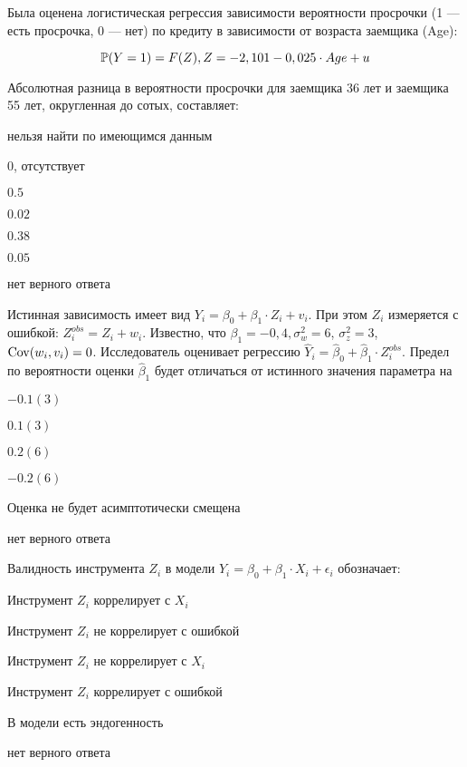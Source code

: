 \begin{question}
Была оценена логистическая регрессия зависимости вероятности просрочки (1 — есть просрочка, 0 — нет) по кредиту в зависимости от возраста заемщика (Age):

\[
  \P(Y = 1) = F (Z), Z = -2,101 - 0,025 \cdot Age+ u 
\]
   
Абсолютная разница в вероятности просрочки для заемщика 36 лет и заемщика 55 лет, округленная до сотых, составляет:
\begin{answerlist}
  \item нельзя найти по имеющимся данным
  \item $0$, отсутствует
  \item $0.5$
  \item $0.02$
  \item $0.38$
  \item $0.05$
  \item нет верного ответа
\end{answerlist}
\end{question}


\begin{question}
Истинная зависимость имеет вид  \( Y_i = \beta_0 + \beta_1 \cdot Z_i + v_i \). 
При этом \( Z_i \) измеряется с ошибкой: \( Z^{obs}_i= Z_i + w_i \). 
Известно, что \( \beta_1= -0,4, \sigma^2_{w} = 6 \), \( \sigma^2_{z} = 3 \), 
\(\Cov(w_i, v_i) = 0\). 
Исследователь оценивает регрессию  $\hat Y_i = \hat\beta_0 + \hat\beta_1 \cdot Z^{obs}_i$. 
Предел по вероятности оценки $\hat\beta_1$ будет отличаться от истинного значения параметра на
\begin{answerlist}
  \item $-0.1(3)$
  \item $0.1(3)$
  \item $0.2(6)$
  \item $-0.2(6)$
  \item Оценка не будет асимптотически смещена
  \item нет верного ответа
\end{answerlist}
\end{question}


\begin{question}
Валидность инструмента \( Z_i \) в модели \( Y_i = \beta_0 + \beta_1 \cdot X_i + \epsilon_i \) обозначает:
\begin{answerlist}
  \item Инструмент \( Z_i \) коррелирует с \( X_i \)
  \item Инструмент \( Z_i \) не коррелирует с ошибкой
  \item Инструмент \( Z_i \) не коррелирует с \( X_i \)
  \item Инструмент \( Z_i \) коррелирует с ошибкой
  \item В модели есть эндогенность
  \item нет верного ответа
\end{answerlist}
\end{question}

